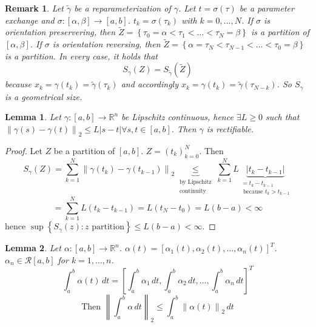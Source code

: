\documentclass{article}
\newtheorem{lemma}{Lemma}  \numberwithin{lemma}{section}
\newtheorem{remark}{Remark}  \numberwithin{remark}{section}
\newcommand{\set}[1]{\left\{#1\right\}}
\newcommand{\norm}[1]{\left\|#1\right\|}
\newcommand{\card}[1]{\left|#1\right|}
\begin{document}
\begin{remark}
  Let $\tilde\gamma$ be a reparameterization of $\gamma$.
  Let $t = \sigma(\tau)$ be a parameter exchange and $\sigma: [\alpha, \beta] \to [a,b]$.
  $t_k = \sigma(\tau_k)$ with $k = 0, \dots, N$.
  If $\sigma$ is orientation preservering, then $\tilde Z = \set{\tau_0 = \alpha < \tau_1 < \dots < \tau_N = \beta}$ is a partition of $[\alpha, \beta]$.
  If $\sigma$ is orientation reversing, then $\tilde Z = \set{\alpha = \tau_N < \tau_{N-1} < \dots < \tau_0 = \beta}$ is a partition.
  In every case, it holds that
  \[ S_{\gamma}(Z) = S_{\tilde\gamma}(\tilde Z) \]
  because $x_k = \gamma(t_k) = \tilde\gamma(\tau_k)$ and accordingly $x_k = \gamma(t_k) = \tilde\gamma(\tau_{N-k})$.
  So $S_\gamma$ is a geometrical size.
\end{remark}

\begin{lemma} %
  Let $\gamma: [a, b] \to \mathbb R^n$ be Lipschitz continuous, hence $\exists L \geq 0$ such that $\norm{\gamma(s) - \gamma(t)}_2 \leq L \card{s - t} \forall s, t \in [a,b]$. Then $\gamma$ is rectifiable.
\end{lemma}

\begin{proof}
  Let $Z$ be a partition of $[a,b]$. $Z = (t_k)_{k=0}^N$. Then
  \[ S_{\gamma}(Z) = \sum_{k=1}^N \norm{\gamma(t_k) - \gamma(t_{k-1})}_2 \underbrace{\leq}_{\substack{\text{by Lipschitz} \\ \text{continuity}}} \sum_{k=1}^N L \underbrace{\card{t_k - t_{k-1}}}_{\substack{= t_k - t_{k-1} \\ \text{ because } t_k > t_{k-1}}} \]
  \[ = \sum_{k=1}^N L(t_k - t_{k-1}) = L(t_N - t_0) = L(b - a) < \infty \]
  hence $\sup\set{S_{\gamma}(z): z \text{ partition}} \leq L(b - a) < \infty$.
\end{proof}

\begin{lemma} %
  \label{lemma2}
  Let $\alpha: [a,b] \to \mathbb R^n$. $\alpha(t) = \left[\alpha_1(t), \alpha_2(t), \dots, \alpha_n(t)\right]^T$.
  $\alpha_n \in \mathcal R[a,b]$ for $k = 1, \dots, n$.
  \[ \int_a^b \alpha(t) \, dt = \left[\int_a^b \alpha_1 \, dt, \int_a^b \alpha_2 \, dt, \dots, \int_a^b \alpha_n \, dt\right]^T \]
  \[ \text{Then } \norm{\int_a^b \alpha \, dt}_2 \leq \int_a^b \norm{\alpha(t)}_2 \, dt \]
\end{lemma}
\end{document}
